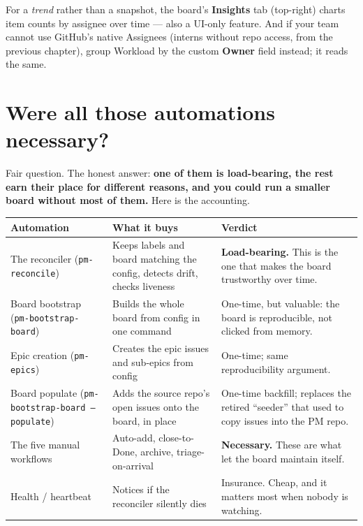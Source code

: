 \documentclass[11pt,a4paper]{report}
\newcommand{\code}[1]{\texttt{#1}}
\begin{document}
\begin{notebox}
For a \emph{trend} rather than a snapshot, the board's \textbf{Insights} tab
(top-right) charts item counts by assignee over time --- also a UI-only feature.
And if your team cannot use GitHub's native Assignees (interns without repo
access, from the previous chapter), group Workload by the custom \textbf{Owner}
field instead; it reads the same.
\end{notebox}

\chapter{Were all those automations necessary?}

Fair question. The honest answer: \textbf{one of them is load-bearing, the rest earn
their place for different reasons, and you could run a smaller board without most of
them.} Here is the accounting.

\begin{center}
\begin{longtable}{@{}p{3.4cm}p{6.4cm}p{3.2cm}@{}}
\toprule
\textbf{Automation} & \textbf{What it buys} & \textbf{Verdict} \\
\midrule
\endhead
The reconciler (\code{pm-reconcile}) & Keeps labels and board matching the config, detects drift, checks liveness & \textbf{Load-bearing.} This is the one that makes the board trustworthy over time. \\
\addlinespace
Board bootstrap (\code{pm-bootstrap-board}) & Builds the whole board from config in one command & One-time, but valuable: the board is reproducible, not clicked from memory. \\
\addlinespace
Epic creation (\code{pm-epics}) & Creates the epic issues and sub-epics from config & One-time; same reproducibility argument. \\
\addlinespace
Board populate (\code{pm-bootstrap-board --populate}) & Adds the source repo's open issues onto the board, in place & One-time backfill; replaces the retired ``seeder'' that used to copy issues into the PM repo. \\
\addlinespace
The five manual workflows & Auto-add, close-to-Done, archive, triage-on-arrival & \textbf{Necessary.} These are what let the board maintain itself. \\
\addlinespace
Health / heartbeat & Notices if the reconciler silently dies & Insurance. Cheap, and it matters most when nobody is watching. \\
\bottomrule
\end{longtable}
\end{center}
\end{document}

